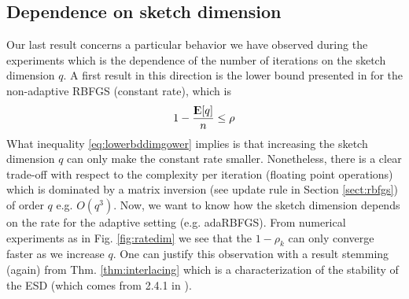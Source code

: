 \documentclass[12pt,conference,compsocconf]{IEEEtran}
\newcommand{\E}{{\rm I\kern-.3em E}}
\begin{document}
\subsection{Dependence on sketch dimension}\label{sect:sketchdim}
Our last result concerns a particular behavior we have observed during the experiments which is the dependence of the number of iterations on the sketch dimension $q$. A first result in this direction is the lower bound presented in \cite{Gower1} for the non-adaptive RBFGS (constant rate), which is 
\begin{align} \label{eq:lowerbddimgower}
	1-\frac{\E[q]}{n}\leq \rho 
\end{align}
What inequality \ref{eq:lowerbddimgower} implies is that increasing the sketch dimension $q$ can only make the constant rate smaller. Nonetheless, there is a clear trade-off with respect to the complexity per iteration (floating point operations) which is dominated by a matrix inversion (see update rule in Section \ref{sect:rbfgs}) of order $q$ e.g. $O(q^{3})$. Now, we want to know how the sketch dimension depends on the rate for the adaptive setting (e.g. adaRBFGS). From numerical experiments as in Fig. \ref{fig:ratedim} we see that the $1-\rho_k$ can only converge faster as we increase $q$. One can justify this observation with a result stemming (again) from Thm. \ref{thm:interlacing} which is a characterization of the stability of the ESD (which comes from 2.4.1 in \cite{Tao}).
\end{document}
